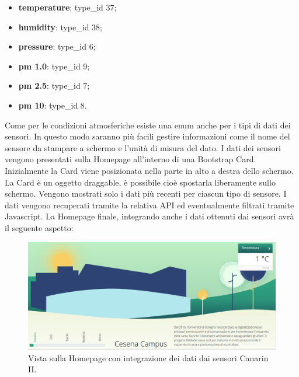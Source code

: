 \begin{itemize}
    \item \textbf{temperature}: type\_id 37;
    \item \textbf{humidity}: type\_id 38;
    \item \textbf{pressure}: type\_id 6; 
    \item \textbf{pm 1.0}: type\_id 9;
    \item \textbf{pm 2.5}: type\_id 7;
    \item \textbf{pm 10}: type\_id 8.
\end{itemize}
\noindent Come per le condizioni atmosferiche esiste una enum anche per i tipi di dati dei sensori. In questo modo saranno più facili gestire informazioni come il nome del sensore da stampare a schermo e l'unità di misura del dato.\newline
I dati dei sensori vengono presentati sulla Homepage all'interno di una Bootstrap Card.
Inizialmente la Card viene posizionata nella parte in alto a destra dello schermo.
La Card è un oggetto draggable, è possibile cioè spostarla liberamente sullo schermo.\newline
Vengono mostrati solo i dati più recenti per ciascun tipo di sensore. I dati vengono recuperati tramite la relativa API ed eventualmente filtrati tramite Javascript.\newline
La Homepage finale, integrando anche i dati ottenuti dai sensori avrà il seguente aspetto:
\begin{figure}[H]
    \centering
    \includegraphics[width=\linewidth]{img/final.png}
        \caption{Vista sulla Homepage con integrazione dei dati dai sensori Canarin II.}
    \label{fig:final}
\end{figure}


